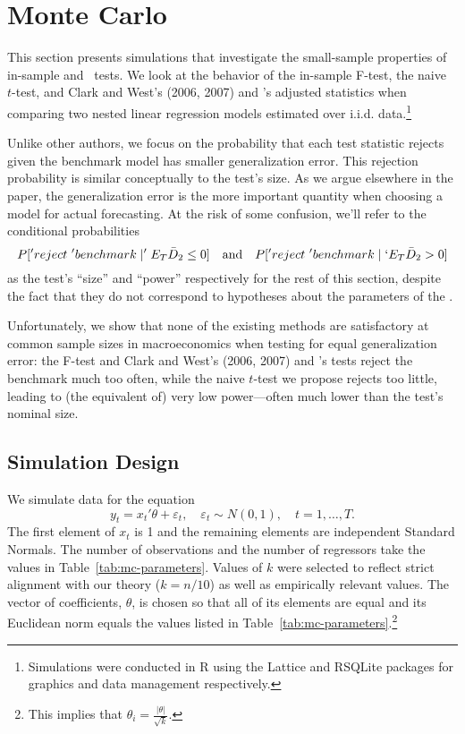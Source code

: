 \documentclass[11pt]{article}
\newcommand{\E}{`E}
\newcommand{\citepos}[1]{\citeauthor{#1}'s \citeyearpar{#1}}
\begin{document}
\section{Monte Carlo}\label{sec:mc}
\newcommand{\thetanorm}{\ensuremath{\lvert \theta \rvert_2}}

This section presents simulations that investigate the small-sample
properties of in-sample and \oos\ tests.  We look at the behavior of
the in-sample F-test, the naive \oos\ $t$-test, and Clark and West's
(2006, 2007) and \citepos{mccracken_asymptotics_2007} adjusted
statistics when comparing two nested linear regression models
estimated over i.i.d.  data.\footnote{Simulations were conducted in R
  \citep{rproject} using the Lattice \citep{lattice} and RSQLite
  \citep{rsqlite} packages for graphics and data management respectively.}

Unlike other authors, we focus on the probability that each test
statistic rejects given the benchmark model has smaller generalization
error.  This rejection probability is similar conceptually to the
test's size.  As we argue elsewhere in the paper, the generalization error is
the more important quantity when choosing a model for actual
forecasting.  At the risk of some confusion, we'll refer to the
conditional probabilities
\[P['reject\ 'benchmark \mid 'E_T \bar D_2 \leq 0] \quad \text{and}
\quad P['reject\ 'benchmark \mid \E_T \bar D_2 > 0]\] as the test's
``size'' and ``power'' respectively for the rest of this section,
despite the fact that they do not correspond to hypotheses about the
parameters of the \dgp.

Unfortunately, we show that none of the existing methods are
satisfactory at common sample sizes in macroeconomics when testing for
equal generalization error: the F-test and Clark and West's (2006,
2007) and \citepos{mccracken_asymptotics_2007} tests reject the
benchmark much too often, while the naive $t$-test we propose rejects
too little, leading to (the equivalent of) very low power---often much
lower than the test's nominal size.
\subsection{Simulation Design}\label{sec:simulation-design}
We simulate data for the equation
\begin{equation*}
  y_t = x_t'\theta + \varepsilon_t,\quad \varepsilon_t \sim N(0,1),
  \quad t=1,\dots,T.
\end{equation*}
The first element of $x_t$ is 1 and the remaining elements are
independent Standard Normals.  The number of observations and the
number of regressors take the values in Table~\ref{tab:mc-parameters}.
Values of $k$ were selected to reflect strict alignment with our
theory ($k=n/10$) as well as empirically relevant values.  The vector
of coefficients, $\theta$, is chosen so that all of its elements are
equal and its Euclidean norm equals the values listed in
Table~\ref{tab:mc-parameters}.\footnote{This implies that $\theta_i =
  \frac{\lvert \theta \rvert}{\sqrt{k}}$.}
\end{document}
